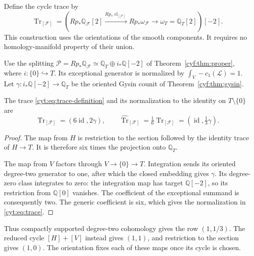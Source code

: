 Define the cycle trace by
\begin{equation}\label{cyt:eq:trace-definition}
 \operatorname{Tr}_{[\mathscr F]}
 =\left(
 Rp_*\mathbb Q_{\mathscr F}[2]
 \xrightarrow{Rp_*\operatorname{cl}_{[\mathscr F]}}
 Rp_*\omega_{\mathscr F}\longrightarrow
 \omega_T=\mathbb Q_T[2]\right)[-2].
\end{equation}
This construction uses the orientations of the smooth components.
It requires no homology-manifold property of their union.

Use the splitting
\(\mathscr P=Rp_*\mathbb Q_{\mathscr F}
\simeq\mathbb Q_T\oplus i_*\mathbb Q[-2]\)
of Theorem~\ref{cyf:thm:proper}, where
\(i:\{0\}\hookrightarrow T\). Its exceptional generator is
normalized by \(\int_V-c_1(\mathscr L)=1\).
Let \(\gamma:i_*\mathbb Q[-2]\to\mathbb Q_T\) be the
oriented Gysin counit of Theorem~\ref{cyf:thm:gysin}.

\begin{theorem}\label{cyt:thm:cycle-trace}
The trace \eqref{cyt:eq:trace-definition} and its normalization
to the identity on \(T\setminus\{0\}\) are
\begin{equation}\label{cyt:eq:trace}
 \operatorname{Tr}_{[\mathscr F]}=(6\operatorname{id},2\gamma),
 \qquad
 \widehat{\operatorname{Tr}}_{[\mathscr F]}
       =\tfrac16\operatorname{Tr}_{[\mathscr F]}
       =(\operatorname{id},\tfrac13\gamma).
\end{equation}
\end{theorem}

\begin{proof}
The map from \(H\) is restriction to the section followed by
the identity trace of \(H\to T\). It is therefore six times
the projection onto \(\mathbb Q_T\).

The map from \(V\) factors through \(V\to\{0\}\to T\).
Integration sends its oriented degree-two generator to one,
after which the closed embedding gives \(\gamma\).
Its degree-zero class integrates to zero: the integration
map has target \(\mathbb Q[-2]\), so its restriction from
\(\mathbb Q[0]\) vanishes. The coefficient of the exceptional
summand is consequently two. The generic coefficient is six,
which gives the normalization in \eqref{cyt:eq:trace}.
\end{proof}

Thus compactly supported degree-two cohomology gives the row
\((1,1/3)\). The reduced cycle \([H]+[V]\) instead gives
\((1,1)\), and restriction to the section gives \((1,0)\).
The orientation fixes each of these maps once its cycle is chosen.

